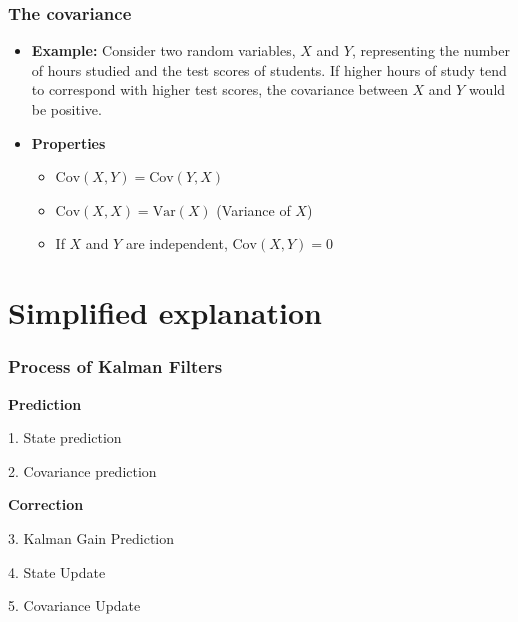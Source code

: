 \documentclass[aspectratio=169]{beamer}
\begin{document}
\begin{frame}
    \frametitle{The covariance}
    \begin{itemize}
        \item \textbf{Example:}
              Consider two random variables, \(X\) and \(Y\), representing the number of hours studied and the test scores of students. If higher hours of study tend to correspond with higher test scores, the covariance between \(X\) and \(Y\) would be positive.
        \item \textbf{Properties}
              \begin{itemize}
                  \item \(\text{Cov}(X, Y) = \text{Cov}(Y, X)\)
                  \item \(\text{Cov}(X, X) = \text{Var}(X)\) (Variance of \(X\))
                  \item If \(X\) and \(Y\) are independent, \(\text{Cov}(X, Y) = 0\)
              \end{itemize}
    \end{itemize}


\end{frame}

\section{Simplified explanation}









\begin{frame}
    \frametitle{Process of Kalman Filters}

    \textbf{Prediction}

    1. State prediction

    2. Covariance prediction

    \textbf{Correction}

    3. Kalman Gain Prediction

    4. State Update

    5. Covariance Update
\end{frame}
\end{document}
